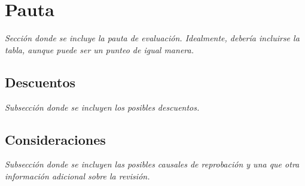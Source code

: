 \section*{Pauta}

\textit{Sección donde se incluye la pauta de evaluación. Idealmente, debería
incluirse la tabla, aunque puede ser un punteo de igual manera.}

\subsection*{Descuentos}

\textit{Subsección donde se incluyen los posibles descuentos.}

\subsection*{Consideraciones}

\textit{Subsección donde se incluyen las posibles causales de reprobación
y una que otra información adicional sobre la revisión.}
